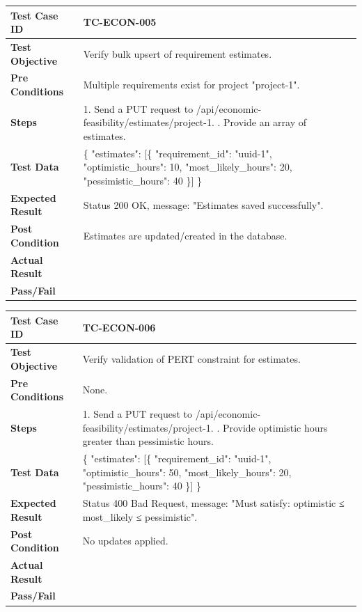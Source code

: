 \begin{longtable}{|p{}|p{}|}
\hline
\textbf{Test Case ID} & TC-ECON-005 \\ \hline
\textbf{Test Objective} & Verify bulk upsert of requirement estimates. \\ \hline
\textbf{Pre Conditions} & Multiple requirements exist for project "project-1". \\ \hline
\textbf{Steps} & 
1. Send a PUT request to /api/economic-feasibility/estimates/project-1. \newline
2. Provide an array of estimates. \\ \hline
\textbf{Test Data} & \{ "estimates": [\{ "requirement\_id": "uuid-1", "optimistic\_hours": 10, "most\_likely\_hours": 20, "pessimistic\_hours": 40 \}] \} \\ \hline
\textbf{Expected Result} & Status 200 OK, message: "Estimates saved successfully". \\ \hline
\textbf{Post Condition} & Estimates are updated/created in the database. \\ \hline
\textbf{Actual Result} &  \\ \hline
\textbf{Pass/Fail} &  \\ \hline
\end{longtable}

\begin{longtable}{|p{}|p{}|}
\hline
\textbf{Test Case ID} & TC-ECON-006 \\ \hline
\textbf{Test Objective} & Verify validation of PERT constraint for estimates. \\ \hline
\textbf{Pre Conditions} & None. \\ \hline
\textbf{Steps} & 
1. Send a PUT request to /api/economic-feasibility/estimates/project-1. \newline
2. Provide optimistic hours greater than pessimistic hours. \\ \hline
\textbf{Test Data} & \{ "estimates": [\{ "requirement\_id": "uuid-1", "optimistic\_hours": 50, "most\_likely\_hours": 20, "pessimistic\_hours": 40 \}] \} \\ \hline
\textbf{Expected Result} & Status 400 Bad Request, message: "Must satisfy: optimistic ≤ most\_likely ≤ pessimistic". \\ \hline
\textbf{Post Condition} & No updates applied. \\ \hline
\textbf{Actual Result} &  \\ \hline
\textbf{Pass/Fail} &  \\ \hline
\end{longtable}

